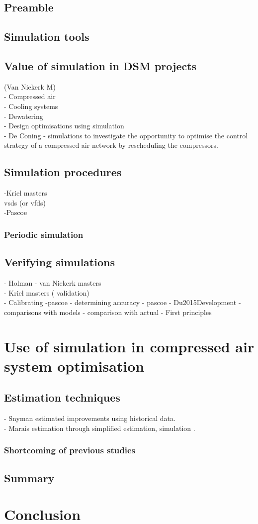 	\subsection{Preamble}
	\subsection{Simulation tools}
	\subsection{Value of simulation in DSM projects}
		(Van Niekerk M)\\
		- Compressed air \\
		- Cooling systems\\
		- Dewatering\\
		- Design optimisations using simulation\\
		- De Coning -  simulations to investigate the opportunity to optimise the control strategy of a compressed air network by rescheduling the compressors.
	\subsection{Simulation procedures}
	
		-Kriel masters\\
		 \glspl{vsd} (or \glspl{vfd}) \\
		-Pascoe
		\subsubsection{Periodic simulation}
 	\subsection{Verifying simulations}
 		- Holman
 		- van Niekerk masters\\
 		- Kriel masters ( validation)\\
 		- Calibrating -pascoe
 		- determining accuracy - pascoe
 		- Du2015Development
 		- comparisons with models
 		- comparison with actual 
 		- First principles
 	
	
	\section{Use of simulation in compressed air system optimisation}
	
	\subsection{Estimation techniques}
	- Snyman estimated improvements using historical data.\cite{Snyman2011Masters}\\
	- Marais estimation through simplified estimation, simulation \cite{Marais2012PhD, marais2013simplification}.
	\clearpage	
	
	\subsubsection{Shortcoming of previous studies}
		\label{Shortcomings of previous work}
	\subsection{Summary}
\section{Conclusion}